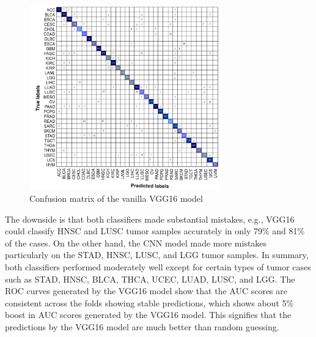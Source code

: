 \begin{figure}[h]
\centering
	\includegraphics[width=0.8\linewidth,height=80mm]{images/conf_uni_modal.png}
	\caption{Confusion matrix of the vanilla VGG16 model}
    \label{fig:conf_cnn}
    \vspace{-4mm}
\end{figure}

\hspace*{3.5mm} The downside is that both classifiers made substantial mistakes, e.g., VGG16 could classify HNSC and LUSC tumor samples accurately in only 79\% and 81\% of the cases. On the other hand, the CNN model made more mistakes particularly on the STAD, HNSC, LUSC, and LGG tumor samples. In summary, both classifiers performed moderately well except for certain types of tumor cases such as STAD, HNSC, BLCA, THCA, UCEC, LUAD, LUSC, and LGG. The ROC curves generated by the VGG16 model 
show that the AUC scores are consistent across the folds showing stable predictions, which shows about 5\% boost in AUC scores generated by the VGG16 model. This signifies that the predictions by the VGG16 model are much better than random guessing. 

